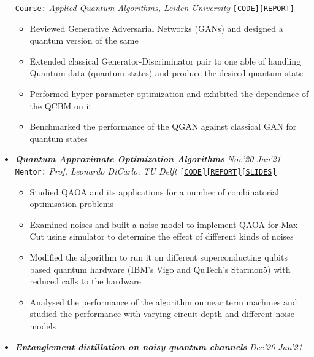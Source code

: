 \documentclass[11pt,a4paper]{article}
\begin{document}
\begin{itemize}
    \texttt{Course:} \textit{Applied Quantum Algorithms, Leiden University} \hfill \href{https://github.com/smitchaudhary/QGANs}{\texttt{[CODE]}}\href{https://github.com/smitchaudhary/QGANs/blob/main/Report.pdf}{\texttt{[REPORT]}}
    \begin{itemize}
        \item Reviewed Generative Adversarial Networks (GANs) and designed a quantum version of the same
        \item Extended classical Generator-Discriminator pair to one able of handling Quantum data (quantum states) and produce the desired quantum state
        \item Performed hyper-parameter optimization and exhibited the dependence of the QCBM on it
        \item Benchmarked the performance of the QGAN against classical GAN for quantum states
    \end{itemize}
    \item \textbf{\textit{Quantum Approximate Optimization Algorithms}} \hfill \textit{Nov'20-Jan'21}\\
    \texttt{Mentor:} \textit{Prof. Leonardo DiCarlo, TU Delft} \hfill
    \href{https://github.com/smitchaudhary/QAOA-MaxCut}{\texttt{[CODE]}}\href{https://github.com/smitchaudhary/QAOA-MaxCut/blob/master/Report.pdf}{\texttt{[REPORT]}}\href{https://github.com/smitchaudhary/QAOA-MaxCut/blob/master/Presentation.pdf}{\texttt{[SLIDES]}}
    \begin{itemize}
        \item Studied QAOA and its applications for a number of combinatorial optimisation problems
        \item Examined noises and built a noise model to implement QAOA for Max-Cut using simulator to determine the effect of different kinds of noises
        \item Modified the algorithm to run it on different superconducting qubits based quantum hardware (IBM's Vigo and QuTech's Starmon5) with reduced calls to the hardware
        \item Analysed the performance of the algorithm on near term machines and studied the performance with varying circuit depth and different noise models
    \end{itemize}
    \item \textbf{\textit{Entanglement distillation on noisy quantum channels}} \hfill \textit{Dec'20-Jan'21}\\

\end{itemize}
\end{document}
